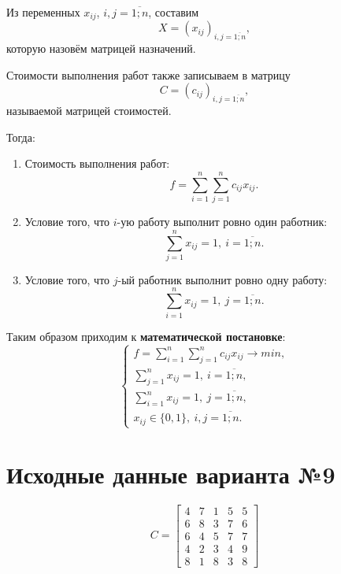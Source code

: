 \documentclass{bmstu}
\begin{document}
Из переменных $x_{ij}$, $i,j = \overline{1; n}$, составим 
\begin{equation}
	X = (x_{ij})_{i,j = \overline{1; n}},
\end{equation}
которую назовём матрицей назначений.

Стоимости выполнения работ также записываем в матрицу
\begin{equation}
	C = (c_{ij})_{i,j = \overline{1; n}},
\end{equation}
называемой матрицей стоимостей.

Тогда:
\begin{enumerate}
	\item Стоимость выполнения работ:
	\begin{equation}
		f = \sum_{i=1}^n \sum_{j=1}^n c_{ij} x_{ij}.
	\end{equation}
	\item Условие того, что $i$-ую работу выполнит ровно один работник:
	\begin{equation}
		\sum_{j=1}^n x_{ij} = 1, \: i = \overline{1; n}.
	\end{equation}
	\item Условие того, что $j$-ый работник выполнит ровно одну работу:
	\begin{equation}
		\sum_{i=1}^n x_{ij} = 1, \: j = \overline{1; n}.
	\end{equation}
\end{enumerate}

Таким образом приходим к \textbf{математической постановке}:
\begin{equation}
	\begin{cases}
		f = \sum_{i=1}^n \sum_{j=1}^n c_{ij} x_{ij} \rightarrow min, \\
		\sum_{j=1}^n x_{ij} = 1, \: i = \overline{1; n}, \\
		\sum_{i=1}^n x_{ij} = 1, \: j = \overline{1; n}, \\
		x_{ij} \in \{0, 1\}, \: i,j = \overline{1; n}.
	\end{cases}
\end{equation}

\section{Исходные данные варианта №9}

\begin{equation}
	C = 
	\begin{bmatrix}
		4 & 7 & 1 & 5 & 5 \\
		6 & 8 & 3 & 7 & 6 \\
		6 & 4 & 5 & 7 & 7 \\
		4 & 2 & 3 & 4 & 9 \\
		8 & 1 & 8 & 3 & 8
	\end{bmatrix}
\end{equation}
\end{document}
